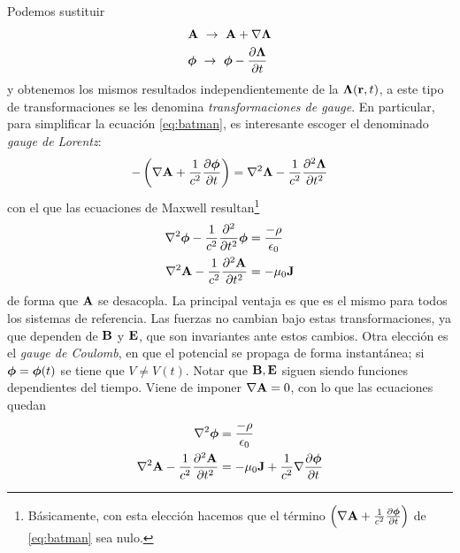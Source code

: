 Podemos sustituir
\begin{equation}
  \begin{split}
    &\bm{\mathrm{A}} \ \rightarrow \ \bm{\mathrm{A}} + \nabla
    \bm{\mathrm{\Lambda}} \\
    &\bm{\mathrm{\phi}} \ \rightarrow \ \bm{\mathrm{\phi}} - \pdv{\bm{\mathrm{\Lambda}}}{t}
  \end{split}
\end{equation}
y obtenemos los mismos resultados independientemente de la
$\bm{\mathrm{\Lambda}}(\bm{\mathrm{r}},t)$, a este tipo de transformaciones
se les denomina \emph{transformaciones de gauge}. En particular, para
simplificar la ecuación \eqref{eq:batman}, es interesante escoger el
denominado \emph{gauge de Lorentz}:
\begin{equation}
  - \left( \nabla \bm{\mathrm{A}} + \frac{1}{c^2}
    \pdv{\bm{\mathrm{\phi}}}{t} \right) = \nabla^2 \bm{\mathrm{\Lambda}}
  - \frac{1}{c^2} \pdv[2]{\bm{\mathrm{\Lambda}}}{t}
\end{equation}
con el que las ecuaciones de Maxwell resultan\footnote{Básicamente,
  con esta elección hacemos que el término $\left( \nabla \bm{\mathrm{A}} + \frac{1}{c^2}
      \pdv{\bm{\mathrm{\phi}}}{t} \right)$ de \eqref{eq:batman} sea nulo. }
\begin{equation}
  \begin{split}
    \nabla^2\bm{\mathrm{\phi}} - \frac{1}{c^2} \pdv[2]{t}
    \bm{\mathrm{\phi}} &= \frac{-\rho}{\epsilon_0} \\
    \nabla^2 \bm{\mathrm{A}} - \frac{1}{c^2} \pdv[2]{\bm{\mathrm{A}}}{t} &=
    -\mu_0 \bm{\mathrm{J}}
  \end{split}
\end{equation}
de forma que $\bm{\mathrm{A}}$ se desacopla. La principal ventaja es que es
el mismo para todos los sistemas de referencia. Las fuerzas no cambian
bajo estas transformaciones, ya que dependen de $\bm{\mathrm{B}}$ y
$\bm{\mathrm{E}}$, que son invariantes ante estos cambios.
Otra elección es el
\emph{gauge de Coulomb}, en que el potencial se propaga de forma
instantánea; si $\bm{\mathrm{\phi}}=\bm{\mathrm{\phi}}(t)$ se tiene que
$V\neq V(t)$. Notar que $\bm{\mathrm{B}},\bm{\mathrm{E}}$ siguen siendo
  funciones dependientes del tiempo.
Viene de imponer $\nabla \bm{\mathrm{A}}=0$,
con lo que las ecuaciones quedan
\begin{equation}
  \begin{split}
    \nabla^2 \bm{\mathrm{\phi}} &= \frac{-\rho}{\epsilon_0} \\
    \nabla^2 \bm{\mathrm{A}} - \frac{1}{c^2} \pdv[2]{\bm{\mathrm{A}}}{t} &=
    -\mu_0 \bm{\mathrm{J}} + \frac{1}{c^2} \nabla \pdv{\bm{\mathrm{\phi}}}{t}
  \end{split}
  \label{eq:robin}
\end{equation}
